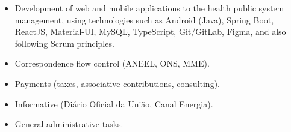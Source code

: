 \documentclass[10pt,a4paper,ragged2e]{altacv}
\begin{document}

\begin{fullwidth}
\makecvheader
\end{fullwidth}




\begin{itemize}
\item Development of web and mobile applications to the health public system management, using technologies such as Android (Java), Spring Boot, ReactJS, Material-UI, MySQL, TypeScript, Git/GitLab, Figma, and also following Scrum principles.
\end{itemize}

\divider


\begin{itemize}
\item Correspondence flow control (ANEEL, ONS, MME).
\item Payments (taxes, associative contributions, consulting).
\item Informative (Diário Oficial da União, Canal Energia).
\end{itemize}

\divider


\begin{itemize}
\item General administrative tasks.
\end{itemize}
\end{document}
